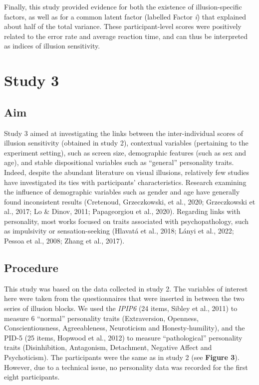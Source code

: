\documentclass[
  man,floatsintext]{apa6}
\begin{document}
Finally, this study provided evidence for both the existence of illusion-specific factors, as well as for a common latent factor (labelled Factor \emph{i}) that explained about half of the total variance. These participant-level scores were positively related to the error rate and average reaction time, and can thus be interpreted as indices of illusion sensitivity.

\hypertarget{study-3}{%
\section{Study 3}\label{study-3}}

\hypertarget{aim-2}{%
\subsection{Aim}\label{aim-2}}

Study 3 aimed at investigating the links between the inter-individual scores of illusion sensitivity (obtained in study 2), contextual variables (pertaining to the experiment setting), such as screen size, demographic features (such as sex and age), and stable dispositional variables such as ``general'' personality traits. Indeed, despite the abundant literature on visual illusions, relatively few studies have investigated its ties with participants' characteristics. Research examining the influence of demographic variables such as gender and age have generally found inconsistent results (Cretenoud, Grzeczkowski, et al., 2020; Grzeczkowski et al., 2017; Lo \& Dinov, 2011; Papageorgiou et al., 2020). Regarding links with personality, most works focused on traits associated with psychopathology, such as impulsivity or sensation-seeking (Hlavatá et al., 2018; Lányi et al., 2022; Pessoa et al., 2008; Zhang et al., 2017).

\hypertarget{procedure-2}{%
\subsection{Procedure}\label{procedure-2}}

This study was based on the data collected in study 2. The variables of interest here were taken from the questionnaires that were inserted in between the two series of illusion blocks. We used the \emph{IPIP6} (24 items, Sibley et al., 2011) to measure 6 ``normal'' personality traits (Extraversion, Openness, Conscientiousness, Agreeableness, Neuroticism and Honesty-humility), and the PID-5 (25 items, Hopwood et al., 2012) to measure ``pathological'' personality traits (Disinhibition, Antagonism, Detachment, Negative Affect and Psychoticism). The participants were the same as in study 2 (see \textbf{Figure 3}). However, due to a technical issue, no personality data was recorded for the first eight participants.
\end{document}
